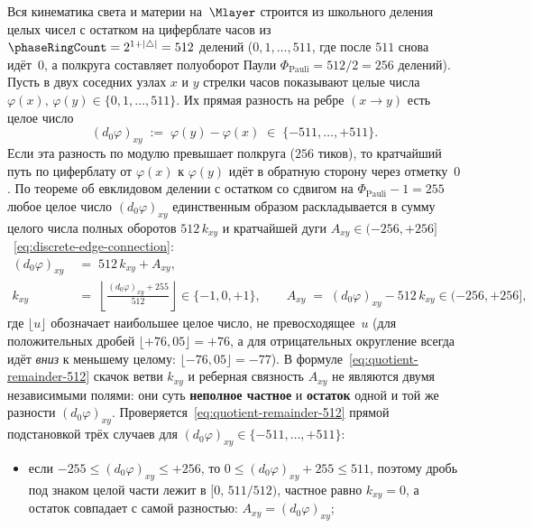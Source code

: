 \begin{corollary}[Единство природы и количества заряда: частное и остаток одного деления на $\phaseRingCount = 512$]
\label{cor:charge-origin-and-count-quotient-remainder}
Вся кинематика света и материи на~$\Mlayer$ строится из школьного деления целых чисел с остатком на циферблате часов из $\phaseRingCount = 2^{1+|\triangle|} = 512$ делений ($0,1,\dots,511$, где после $511$ снова идёт~$0$, а полкруга составляет полуоборот Паули $\Phi_{\mathrm{Pauli}} = 512/2 = 256$ делений).
Пусть в двух соседних узлах $x$ и $y$ стрелки часов показывают целые числа $\varphi(x),\,\varphi(y)\in\{0,1,\dots,511\}$.
Их прямая разность на ребре $(x\to y)$ есть целое число
\[
  (d_0\varphi)_{xy} \;:=\; \varphi(y) - \varphi(x) \;\in\; \{-511,\dots,+511\}.
\]
Если эта разность по модулю превышает полкруга ($256$ тиков), то кратчайший путь по циферблату от $\varphi(x)$ к $\varphi(y)$ идёт в обратную сторону через отметку~$0$.
По теореме об евклидовом делении с остатком со сдвигом на $\Phi_{\mathrm{Pauli}}-1 = 255$ любое целое число $(d_0\varphi)_{xy}$ единственным образом раскладывается в сумму целого числа полных оборотов $512\,k_{xy}$ и кратчайшей дуги $A_{xy}\in(-256,+256]$~\eqref{eq:discrete-edge-connection}:
\begin{equation}
\label{eq:quotient-remainder-512}
\begin{aligned}
  (d_0\varphi)_{xy} &\;=\; 512\,k_{xy} + A_{xy},\\
  k_{xy} &\;=\; \left\lfloor \frac{(d_0\varphi)_{xy} + 255}{512} \right\rfloor \in \{-1,0,+1\},
  \qquad
  A_{xy} \;=\; (d_0\varphi)_{xy} - 512\,k_{xy} \in (-256,+256],
\end{aligned}
\end{equation}
где $\lfloor u\rfloor$ обозначает наибольшее целое число, не превосходящее~$u$ (для положительных дробей $\lfloor +76{,}05\rfloor = +76$, а для отрицательных округление всегда идёт \emph{вниз} к меньшему целому: $\lfloor -76{,}05\rfloor = -77$).
В формуле~\eqref{eq:quotient-remainder-512} скачок ветви $k_{xy}$ и реберная связность $A_{xy}$ не являются двумя независимыми полями:
они суть \textbf{неполное частное} и \textbf{остаток} одной и той же разности $(d_0\varphi)_{xy}$.
Проверяется~\eqref{eq:quotient-remainder-512} прямой подстановкой трёх случаев для $(d_0\varphi)_{xy}\in\{-511,\dots,+511\}$:
\begin{itemize}[nosep,leftmargin=*]
\item если $-255 \le (d_0\varphi)_{xy} \le +256$, то $0 \le (d_0\varphi)_{xy} + 255 \le 511$, поэтому дробь под знаком целой части лежит в $[0,\,511/512)$, частное равно $k_{xy} = 0$, а остаток совпадает с самой разностью: $A_{xy} = (d_0\varphi)_{xy}$;

\end{itemize}
\end{corollary}
